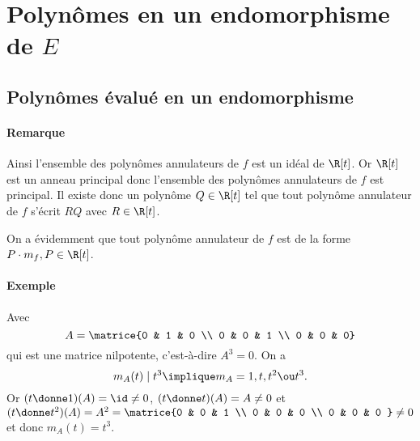 \section{Polynômes en un endomorphisme de $E$}

\subsection{Polynômes évalué en un endomorphisme}


\paragraph{Remarque}Ainsi l'ensemble des polynômes annulateurs de $f$ est un idéal de $\R[t]$. Or $\R[t]$ est un anneau principal donc l'ensemble des polynômes annulateurs de $f$ est principal. Il existe donc un polynôme $Q\in \R[t]$ tel que tout polynôme annulateur de $f$ s'écrit $RQ$ avec $R\in \R[t]$.

On a évidemment que tout polynôme annulateur de $f$ est de la forme $P\cdot m_f, P \in \R[t]$.

\paragraph{Exemple}Avec \[A = \matrice{0 & 1 & 0 \\ 0 & 0 & 1 \\ 0 & 0 & 0} \] qui est une matrice nilpotente, c'est-à-dire $A^{3} = 0$. On a \[m_A(t) \mid t^{3} \implique m_A = 1,t,t^{2} \ou t^{3}.\] Or $(t\donne 1)(A) = \id \neq 0$, $(t\donne t)(A) = A \neq 0$ et $(t\donne t^{2})(A) = A^{2} = \matrice{0 & 0 & 1 \\ 0 & 0 & 0 \\ 0 & 0 & 0 }\neq 0$ et donc $m_A(t) = t^{3}$. 

